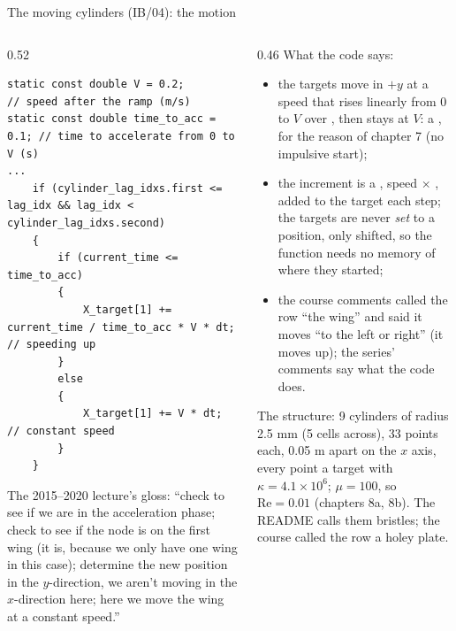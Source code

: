 \documentclass[aspectratio=169,11pt]{beamer}
\begin{document}
\begin{frame}[fragile]{The moving cylinders (IB/04): the motion}
\label{fr:cyl}
\begin{columns}[T,onlytextwidth]
\begin{column}{0.52\textwidth}
\begin{lstlisting}[style=cpptiny]
static const double V = 0.2;           // speed after the ramp (m/s)
static const double time_to_acc = 0.1; // time to accelerate from 0 to V (s)
...
    if (cylinder_lag_idxs.first <= lag_idx && lag_idx < cylinder_lag_idxs.second)
    {
        if (current_time <= time_to_acc)
        {
            X_target[1] += current_time / time_to_acc * V * dt; // speeding up
        }
        else
        {
            X_target[1] += V * dt;                              // constant speed
        }
    }
\end{lstlisting}
\footnotesize The 2015--2020 lecture's gloss: ``check to see if we are in the acceleration phase; check to see if the node is on the first wing (it is, because we only have one wing in this case); determine the new position in the $y$-direction, we aren't moving in the $x$-direction here; here we move the wing at a constant speed.''
\end{column}
\begin{column}{0.46\textwidth}
\scriptsize What the code says:
\begin{itemize}
  \item the targets move in $+y$ at a speed that rises linearly from $0$ to $V$ over , then stays at $V$: a , for the reason of chapter 7 (no impulsive start);
  \item the increment is a , speed $\times$ , added to the target each step; the targets are never \emph{set} to a position, only shifted, so the function needs no memory of where they started;
  \item the course comments called the row ``the wing'' and said it moves ``to the left or right'' (it moves up); the series' comments say what the code does.
\end{itemize}
\scriptsize The structure: 9 cylinders of radius 2.5 mm (5 cells across), 33 points each, 0.05 m apart on the $x$ axis, every point a target with $\kappa = 4.1\times10^6$; $\mu = 100$, so $\mathrm{Re} = 0.01$ (chapters 8a, 8b). The README calls them bristles; the course called the row a holey plate.
\end{column}
\end{columns}
\end{frame}
\end{document}
